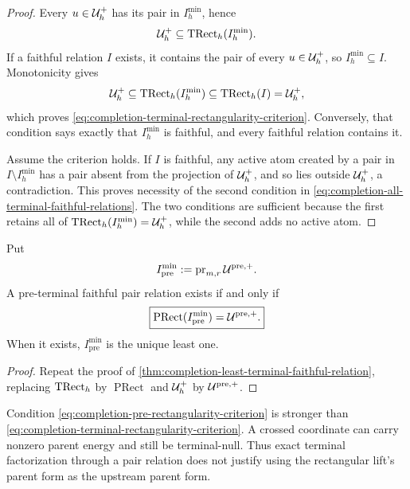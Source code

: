 \begin{proof}
Every \(u\in\mathcal U_h^+\) has its pair in \(I_h^{\min}\), hence
\begin{equation}
 \mathcal U_h^+\subseteq\operatorname{TRect}_h(I_h^{\min}).
 \label{eq:completion-active-contained-in-min-closure}
\end{equation}
If a faithful relation \(I\) exists, it contains the pair of every
\(u\in\mathcal U_h^+\), so \(I_h^{\min}\subseteq I\).  Monotonicity gives
\[
 \mathcal U_h^+
 \subseteq\operatorname{TRect}_h(I_h^{\min})
 \subseteq\operatorname{TRect}_h(I)
 =\mathcal U_h^+,
\]
which proves \eqref{eq:completion-terminal-rectangularity-criterion}.
Conversely, that condition says exactly that \(I_h^{\min}\) is faithful,
and every faithful relation contains it.

Assume the criterion holds.  If \(I\) is faithful, any active atom created
by a pair in \(I\setminus I_h^{\min}\) has a pair absent from the
projection of \(\mathcal U_h^+\), and so lies outside \(\mathcal U_h^+\), a
contradiction.  This proves necessity of the second condition in
\eqref{eq:completion-all-terminal-faithful-relations}.  The two conditions
are sufficient because the first retains all of
\(\operatorname{TRect}_h(I_h^{\min})=\mathcal U_h^+\), while the second adds no active atom.
\end{proof}

\begin{corollary}
\label{cor:completion-least-preterminal-faithful-relation}
Put
\begin{equation}
 I_{\mathrm{pre}}^{\min}
 :=\operatorname{pr}_{m,r}\mathcal U^{\mathrm{pre},+}.
 \label{eq:completion-Ipre-min}
\end{equation}
A pre-terminal faithful pair relation exists if and only if
\begin{equation}
 \boxed{
 \operatorname{PRect}(I_{\mathrm{pre}}^{\min})
 =\mathcal U^{\mathrm{pre},+}.}
 \label{eq:completion-pre-rectangularity-criterion}
\end{equation}
When it exists, \(I_{\mathrm{pre}}^{\min}\) is the unique least one.
\end{corollary}

\begin{proof}
Repeat the proof of
\cref{thm:completion-least-terminal-faithful-relation}, replacing
\(\operatorname{TRect}_h\) by \(\operatorname{PRect}\) and \(\mathcal U_h^+\) by
\(\mathcal U^{\mathrm{pre},+}\).
\end{proof}

Condition \eqref{eq:completion-pre-rectangularity-criterion} is stronger
than \eqref{eq:completion-terminal-rectangularity-criterion}.  A crossed
coordinate can carry nonzero parent energy and still be terminal-null.
Thus exact terminal factorization through a pair relation does not justify
using the rectangular lift's parent form as the upstream parent form.

